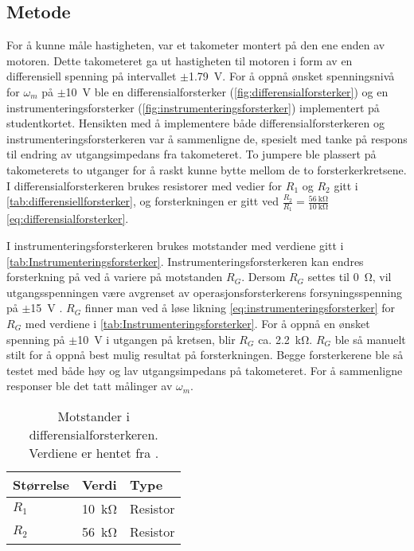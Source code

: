 \subsection{Metode}

For å kunne måle hastigheten, var et takometer montert på den ene enden av motoren.
Dette takometeret ga ut hastigheten til motoren i form av en differensiell spenning på intervallet $\pm${\SI{1.79}{\volt}}.
For å oppnå ønsket spenningsnivå for $\omega_m$ på $\pm${\SI{10}{\volt}} ble en differensialforsterker (\autoref{fig:differensialforsterker}) og en instrumenteringsforsterker (\autoref{fig:instrumenteringsforsterker}) implementert på studentkortet.
Hensikten med å implementere både differensialforsterkeren og instrumenteringsforsterkeren var å sammenligne de, spesielt med tanke på respons til endring av utgangsimpedans fra takometeret.
To jumpere ble plassert på takometerets to utganger for å raskt kunne bytte mellom de to forsterkerkretsene. I differensialforsterkeren brukes resistorer med vedier for $R_1$ og $R_2$ gitt i \autoref{tab:differensiellforsterker}, og forsterkningen er gitt ved $\frac{R_2}{R_1} = \frac{\SI{56}{\kilo\ohm}}{\SI{10}{\kilo\ohm}}$\eqref{eq:differensialforsterker}.

I instrumenteringsforsterkeren brukes motstander med verdiene gitt i \autoref{tab:Instrumenteringsforsterker}. Instrumenteringsforsterkeren kan endres forsterkning på ved å variere på motstanden $R_G$. 
Dersom $R_G$ settes til {\SI{0}{\ohm}}, vil utgangsspenningen være avgrenset av operasjonsforsterkerens forsyningsspenning på $\pm${\SI{15}{\volt}} . 
$R_G$ finner man ved å løse likning \eqref{eq:instrumenteringsforsterker} for $R_G$ med verdiene i \autoref{tab:Instrumenteringsforsterker}. For å oppnå en ønsket spenning på $\pm${\SI{10}{\volt}} i utgangen på kretsen, blir $R_G$ ca. {\SI{2.2}{\kilo\ohm}}. $R_G$ ble så manuelt stilt for å oppnå best mulig resultat på forsterkningen. Begge forsterkerene ble så testet med både høy og lav utgangsimpedans på takometeret. For å sammenligne responser ble det tatt målinger av $\omega_m$.

\begin{table}[h]
	\centering
    \caption{Motstander i differensialforsterkeren. Verdiene er hentet fra \cite{AnalogMotorlabbOppgaver}.}
	\begin{tabular}{lll}
		\toprule
		Størrelse & Verdi & Type \\
		\midrule
        $R_1$ & \SI{10}{\kilo\ohm} & Resistor \\
        $R_2$ & \SI{56}{\kilo\ohm} & Resistor\\
		\bottomrule
	\end{tabular}
\label{tab:differensiellforsterker}
\end{table}

